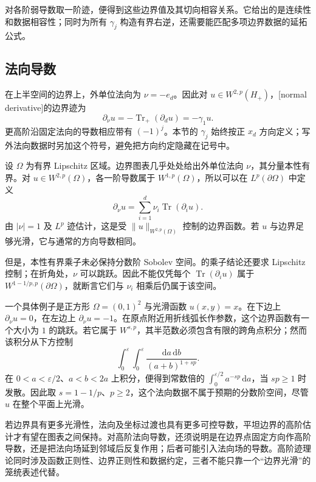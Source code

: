 \ProseParagraphBreak

对各阶弱导数取一阶迹，便得到这些边界值及其切向相容关系。它给出的是连续性和数据相容性；同时为所有 \(\gamma_j\) 构造有界右逆，还需要能匹配多项边界数据的延拓公式。

\subsection{法向导数}
\label{b1:subsec:230402}

在上半空间的边界上，外单位法向为 \(\nu=-e_d\)。因此对 \(u\in W^{2,p}(H_+)\)，[normal derivative]的边界迹为
\[
 \partial_\nu u=-\operatorname{Tr}_+(\partial_du)=-\gamma_1u.
\]
更高阶沿固定法向的导数相应带有 \((-1)^j\)。本节的 \(\gamma_j\) 始终按正 \(x_d\) 方向定义；写外法向数据时另加这个符号，避免把方向约定隐藏在记号中。

\ProseParagraphBreak

设 \(\Omega\) 为有界 Lipschitz 区域。边界图表几乎处处给出外单位法向 \(\nu\)，其分量本性有界。对 \(u\in W^{2,p}(\Omega)\)，各一阶导数属于 \(W^{1,p}(\Omega)\)，所以可以在 \(L^p(\partial\Omega)\) 中定义
\[
 \partial_\nu u
 =\sum_{i=1}^d\nu_i\operatorname{Tr}(\partial_i u).
\]
由 \(|\nu|=1\) 及 \(L^p\) 迹估计，这是受 \(\|u\|_{W^{2,p}(\Omega)}\) 控制的边界函数。若 \(u\) 与边界足够光滑，它与通常的方向导数相同。

\ProseParagraphBreak

但是，本性有界乘子未必保持分数阶 Sobolev 空间。的乘子结论还要求 Lipschitz 控制；在折角处，\(\nu\) 可以跳跃。因此不能仅凭每个 \(\operatorname{Tr}(\partial_i u)\) 属于 \(W^{1-1/p,p}(\partial\Omega)\)，就断言它们与 \(\nu_i\) 相乘后仍属于该空间。

\ProseParagraphBreak

一个具体例子是正方形 \(\Omega=(0,1)^2\) 与光滑函数 \(u(x,y)=x\)。在下边上 \(\partial_\nu u=0\)，在左边上 \(\partial_\nu u=-1\)。在原点附近用折线弧长作参数，这个边界函数有一个大小为 \(1\) 的跳跃。若它属于 \(W^{s,p}\)，其半范数必须包含有限的跨角点积分；然而该积分从下方控制
\[
 \int_0^\varepsilon\int_0^\varepsilon
       \frac{\mathrm da\,\mathrm db}{(a+b)^{1+sp}}.
\]
在 \(0<a<\varepsilon/2\)、\(a<b<2a\) 上积分，便得到常数倍的
\(\int_0^{\varepsilon/2}a^{-sp}\,\mathrm da\)，当 \(sp\ge1\) 时发散。因此取 \(s=1-1/p\)、\(p\ge2\)，这个法向数据不属于预期的分数阶空间，尽管 \(u\) 在整个平面上光滑。

\ProseParagraphBreak

若边界具有更多光滑性，法向及坐标过渡也具有更多可控导数，平坦边界的高阶估计才有望在图表之间保持。对高阶法向导数，还须说明是在边界点固定方向作高阶导数，还是把法向场延到邻域后反复作用；后者可能引入法向场的导数。高阶迹理论同时涉及函数正则性、边界正则性和数据约定，三者不能只靠一个“边界光滑”的笼统表述代替。

